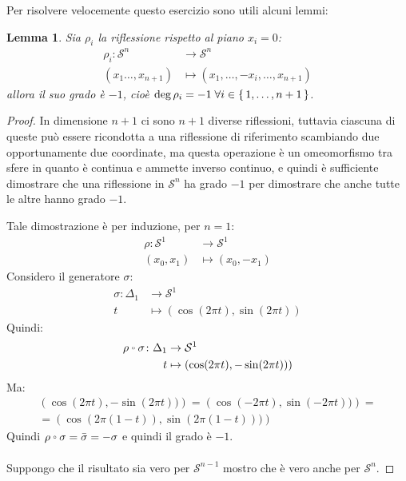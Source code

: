\documentclass[10pt, toc=sectionentrywithdots]{scrartcl}
\newcounter{lemmac}
\newtheorem{lemma}[lemmac]{Lemma}
\newcommand{\Sph}[1][]{\mathcal{S}^#1}
\let\latexcirc=\circ
\newcommand{\ccirc}{\mathbin{\mathchoice
  {\xcirc\scriptstyle}
  {\xcirc\scriptstyle}
  {\xcirc\scriptscriptstyle}
  {\xcirc\scriptscriptstyle}
}}
\newcommand{\xcirc}[1]{\vcenter{\hbox{$#1\latexcirc$}}}
\let\circ\ccirc
\begin{document}
Per risolvere velocemente questo esercizio sono utili alcuni lemmi:
\begin{lemma}
  Sia $ \rho_i $ la riflessione rispetto al piano $ x_i = 0 $:
  \begin{align*}
    \rho_i \colon \Sph{n} & \to \Sph{n} \\
    (x_1\dots, x_{n+1}) & \mapsto (x_1,\dots,-x_i, \dots, x_{n+1})
  \end{align*}
  allora il suo grado è $ -1 $, cioè $ \deg \rho_i = -1 \; \forall i \in \set{1, \dots, n+1} $.
\end{lemma}
\begin{proof}
  In dimensione $ n + 1 $ ci sono $ n + 1 $ diverse riflessioni, tuttavia
  ciascuna di queste può essere ricondotta a una riflessione di riferimento
  scambiando due opportunamente due coordinate, ma questa operazione è
  un omeomorfismo tra sfere in quanto è continua e ammette inverso continuo,
  e quindi è sufficiente dimostrare che una riflessione in $\Sph{n} $
  ha grado $ - 1 $ per dimostrare che anche tutte le altre hanno grado $ - 1 $.

  Tale dimostrazione è per induzione, per $ n = 1 $:
  \begin{align*}
    \rho \colon \Sph{1} & \to \Sph{1} \\
    (x_0,x_1) & \mapsto (x_0, -x_1)
  \end{align*}
  Considero il generatore $ \sigma $:
  \begin{align*}
    \sigma \colon \Delta_1 & \to \Sph{1} \\
    t & \mapsto \left(\cos(2 \pi t), \sin(2 \pi t)\right)
  \end{align*}
  Quindi:
  \begin{align*}
    \rho \circ \sigma \colon \Delta_1 & \to \Sph{1} \\
    t & \mapsto \left(\cos(2 \pi t), -\sin(2 \pi t))\right)
  \end{align*}
  Ma:
  \begin{gather*}
    \left(\cos(2 \pi t), -\sin(2 \pi t))\right) = \left(\cos(-2 \pi t), \sin(-2 \pi t))\right) = \\
    = \left(\cos(2 \pi (1-t)), \sin(2 \pi (1-t)))\right)
  \end{gather*}
  Quindi $ \rho \circ \sigma = \bar{\sigma} = - \sigma $ e quindi il grado è $ - 1 $.
  \\ \\ \noindent
  Suppongo che il risultato sia vero per $ \Sph{n-1} $ mostro che è vero anche per $ \Sph{n} $.


\end{proof}
\end{document}
